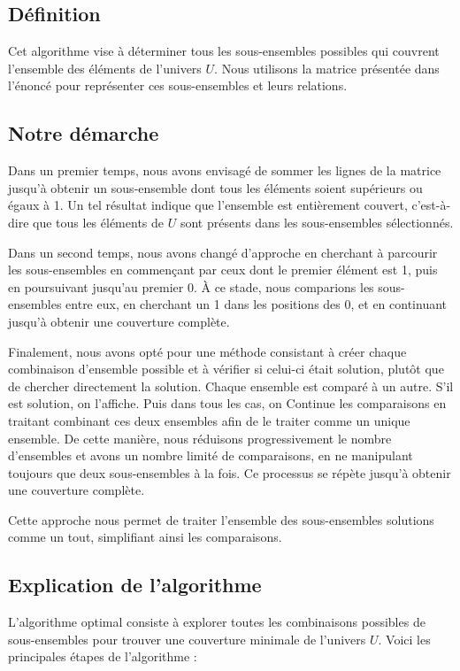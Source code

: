 \documentclass[a4paper, 12pt, twoside]{article}
\begin{document}
\subsection{Définition}

Cet algorithme vise à déterminer tous les sous-ensembles possibles qui couvrent l’ensemble des 
éléments de l'univers \( U \). Nous utilisons la matrice présentée dans l'énoncé pour représenter 
ces sous-ensembles et leurs relations.

\subsection{Notre démarche}

Dans un premier temps, nous avons envisagé de sommer les lignes de la matrice 
jusqu'à obtenir un sous-ensemble dont tous les éléments soient supérieurs ou égaux à 1. 
Un tel résultat indique que l’ensemble est entièrement couvert, c'est-à-dire que tous les 
éléments de \( U \) sont présents dans les sous-ensembles sélectionnés.

Dans un second temps, nous avons changé d’approche en cherchant à parcourir les sous-ensembles 
en commençant par ceux dont le premier élément est 1, puis en poursuivant jusqu’au premier 0. 
À ce stade, nous comparions les sous-ensembles entre eux, en cherchant un 1 dans les positions 
des 0, et en continuant jusqu’à obtenir une couverture complète. 

Finalement, nous avons opté pour une méthode consistant à créer chaque combinaison d'ensemble possible
et à vérifier si celui-ci était solution, plutôt que de chercher directement la solution.
Chaque ensemble est comparé à un autre. S'il est solution, on l'affiche. Puis dans tous les cas, on Continue
les comparaisons en traitant combinant ces deux ensembles afin de le traiter comme un unique ensemble.
De cette manière, nous réduisons progressivement le nombre d'ensembles et avons un 
nombre limité de comparaisons, en ne manipulant toujours que deux sous-ensembles à la fois. 
Ce processus se répète jusqu'à obtenir une couverture complète.

Cette approche nous permet de traiter l’ensemble des sous-ensembles solutions comme un tout, simplifiant ainsi les comparaisons.

\subsection{Explication de l'algorithme}

L'algorithme optimal consiste à explorer toutes les combinaisons possibles de sous-ensembles pour trouver une couverture minimale de l'univers \( U \). Voici les principales étapes de l'algorithme :
\end{document}
